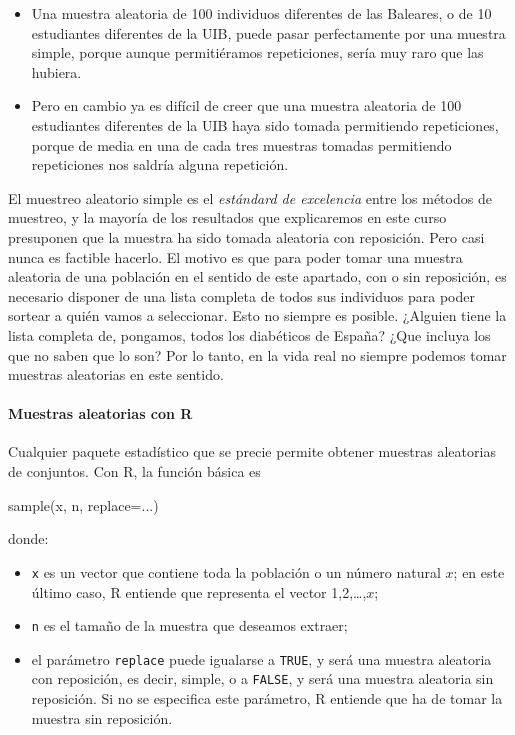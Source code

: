 \documentclass[
]{book}
\newenvironment{Shaded}{\begin{snugshade}}{\end{snugshade}}
\newcommand{\AttributeTok}[1]{\textcolor[rgb]{0.77,0.63,0.00}{#1}}
\newcommand{\FunctionTok}[1]{\textcolor[rgb]{0.00,0.00,0.00}{#1}}
\newcommand{\NormalTok}[1]{#1}
\theoremstyle{definition}
\theoremstyle{definition}
\theoremstyle{definition}
\theoremstyle{definition}
\theoremstyle{remark}
\begin{document}
\begin{itemize}
\item
  Una muestra aleatoria de 100 individuos diferentes de las Baleares, o de 10 estudiantes diferentes de la UIB, puede pasar perfectamente por una muestra simple, porque aunque permitiéramos repeticiones, sería muy raro que las hubiera.
\item
  Pero en cambio ya es difícil de creer que una muestra aleatoria de 100 estudiantes diferentes de la UIB haya sido tomada permitiendo repeticiones, porque de media en una de cada tres muestras tomadas permitiendo repeticiones nos saldría alguna repetición.
\end{itemize}

El muestreo aleatorio simple es el \emph{estándard de excelencia} entre los métodos de muestreo, y la mayoría de los resultados que explicaremos en este curso presuponen que la muestra ha sido tomada aleatoria con reposición. Pero casi nunca es factible hacerlo. El motivo es que para poder tomar una muestra aleatoria de una población en el sentido de este apartado, con o sin reposición, es necesario disponer de una lista completa de todos sus individuos para poder sortear a quién vamos a seleccionar. Esto no siempre es posible. ¿Alguien tiene la lista completa de, pongamos, todos los diabéticos de España? ¿Que incluya los que no saben que lo son? Por lo tanto, en la vida real no siempre podemos tomar muestras aleatorias en este sentido.

\hypertarget{muestras-aleatorias-con-r}{%
\paragraph*{Muestras aleatorias con R}\label{muestras-aleatorias-con-r}}

Cualquier paquete estadístico que se precie permite obtener muestras aleatorias de conjuntos. Con R, la función básica es

\begin{Shaded}
\begin{Highlighting}[]
\FunctionTok{sample}\NormalTok{(x, n, }\AttributeTok{replace=}\NormalTok{...)}
\end{Highlighting}
\end{Shaded}

donde:

\begin{itemize}
\item
  \texttt{x} es un vector que contiene toda la población o un número natural \(x\); en este último caso, R entiende que representa el vector 1,2,\ldots,\(x\);
\item
  \texttt{n} es el tamaño de la muestra que deseamos extraer;
\item
  el parámetro \texttt{replace} puede igualarse a \texttt{TRUE}, y será una muestra aleatoria con reposición, es decir, simple, o a \texttt{FALSE}, y será una muestra aleatoria sin reposición. Si no se especifica este parámetro, R entiende que ha de tomar la muestra sin reposición.
\end{itemize}
\end{document}
